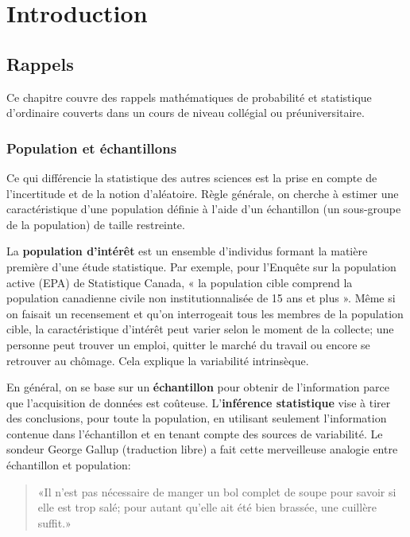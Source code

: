 \documentclass[
  11pt,
  letterpaper,
]{scrbook}
\theoremstyle{definition}
\theoremstyle{definition}
\theoremstyle{remark}
\begin{document}

\chapter{Introduction}\label{intro}

\section{Rappels}\label{rappels}

Ce chapitre couvre des rappels mathématiques de probabilité et
statistique d'ordinaire couverts dans un cours de niveau collégial ou
préuniversitaire.

\subsection{Population et échantillons}\label{population-echantillon}

Ce qui différencie la statistique des autres sciences est la prise en
compte de l'incertitude et de la notion d'aléatoire. Règle générale, on
cherche à estimer une caractéristique d'une population définie à l'aide
d'un échantillon (un sous-groupe de la population) de taille restreinte.

La \textbf{population d'intérêt} est un ensemble d'individus formant la
matière première d'une étude statistique. Par exemple, pour l'Enquête
sur la population active (EPA) de Statistique Canada, « la population
cible comprend la population canadienne civile non institutionnalisée de
15 ans et plus ». Même si on faisait un recensement et qu'on
interrogeait tous les membres de la population cible, la caractéristique
d'intérêt peut varier selon le moment de la collecte; une personne peut
trouver un emploi, quitter le marché du travail ou encore se retrouver
au chômage. Cela explique la variabilité intrinsèque.

En général, on se base sur un \textbf{échantillon} pour obtenir de
l'information parce que l'acquisition de données est coûteuse.
L'\textbf{inférence statistique} vise à tirer des conclusions, pour
toute la population, en utilisant seulement l'information contenue dans
l'échantillon et en tenant compte des sources de variabilité. Le sondeur
George Gallup (traduction libre) a fait cette merveilleuse analogie
entre échantillon et population:

\begin{quote}
«Il n'est pas nécessaire de manger un bol complet de soupe pour savoir
si elle est trop salé; pour autant qu'elle ait été bien brassée, une
cuillère suffit.»
\end{quote}
\end{document}
